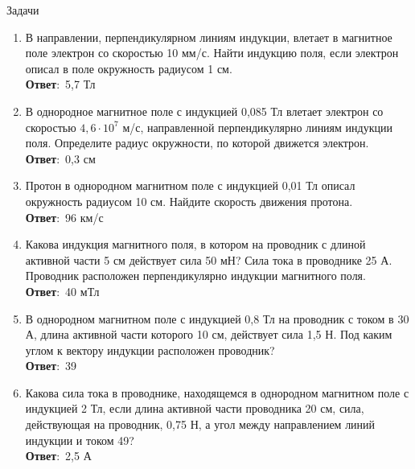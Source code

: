 \documentclass[a5paper, 10pt]{diss_4}
\renewcommand{\'}{\,'}
\begin{document}
\begin{center}
   Задачи
\end{center}
\begin{enumerate}
\item В направлении, перпендикулярном линиям индукции, влетает в магнитное поле электрон со скоростью 10 мм/с. Найти индукцию поля, если электрон описал в поле окружность радиусом 1 см.
\\\textbf{Ответ}:\ 5,7 Тл

\item В однородное магнитное поле с индукцией 0,085 Тл влетает электрон со скоростью $4,6\cdot10^7$ м/с, направленной перпендикулярно линиям индукции поля. Определите радиус окружности, по которой движется электрон.
\\\textbf{Ответ}:\ 0,3 см

\item Протон в однородном магнитном поле с индукцией 0,01 Тл описал окружность радиусом 10 см. Найдите скорость движения протона.
\\\textbf{Ответ}:\ 96 км/с

\item Какова индукция магнитного поля, в котором на проводник с длиной активной части 5 см действует сила 50 мН? Сила тока в проводнике 25 А. Проводник расположен перпендикулярно индукции магнитного поля.
\\\textbf{Ответ}:\ 40 мТл

\item В однородном магнитном поле с индукцией 0,8 Тл на проводник с током в 30 А, длина активной части которого 10 см, действует сила 1,5 Н. Под каким углом к вектору индукции расположен проводник?
\\\textbf{Ответ}:\ 39\textdegree
\item Какова сила тока в проводнике, находящемся в однородном магнитном поле с индукцией 2 Тл, если длина активной части проводника 20 см, сила, действующая на проводник, 0,75 Н, а угол между направлением линий индукции и током 49\textdegree?
\\\textbf{Ответ}:\ 2,5 А
\end{enumerate}
\end{document}
